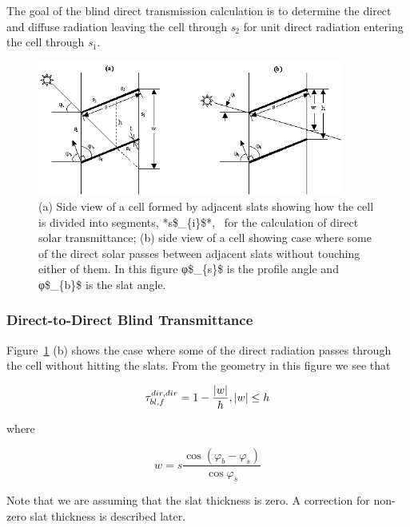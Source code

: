 The goal of the blind direct transmission calculation is to determine the direct and diffuse radiation leaving the cell through \emph{s\(_{2}\)} for unit direct radiation entering the cell through \emph{s\(_{1}\)}.

\begin{figure}[hbtp] %
\centering
\includegraphics[width=0.9\textwidth, height=0.9\textheight, keepaspectratio=true]{media/image1034.png}
\caption{(a) Side view of a cell formed by adjacent slats showing how the cell is divided into segments, *s\$\_\{i\}\$*,  for the calculation of direct solar transmittance; (b) side view of a cell showing case where some of the direct solar passes between adjacent slats without touching either of them. In this figure φ\$\_\{s\}\$ is the profile angle and φ\$\_\{b\}\$ is the slat angle. \protect \label{fig:a-side-view-of-a-cell-formed-by-adjacent}}
\end{figure}

\subsubsection{Direct-to-Direct Blind Transmittance}\label{direct-to-direct-blind-transmittance}

Figure~\ref{fig:a-side-view-of-a-cell-formed-by-adjacent} (b) shows the case where some of the direct radiation passes through the cell without hitting the slats. From the geometry in this figure we see that

\begin{equation}
\tau_{bl,f}^{dir,dir} = 1 - \frac{{|w|}}{h},{\rm{       }}|w|{\rm{ }} \le {\rm{ }}h
\end{equation}

where

\begin{equation}
w = s\frac{{\cos ({\varphi_b} - {\varphi_s})}}{{\cos {\varphi_s}}}
\end{equation}

Note that we are assuming that the slat thickness is zero. A correction for non-zero slat thickness is described later.

